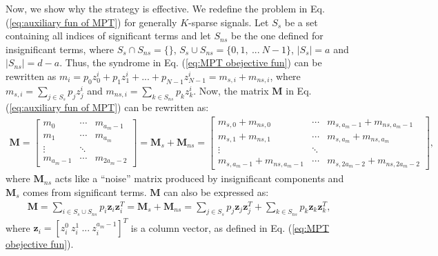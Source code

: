 \documentclass[journal,onecolumn,11pt]{IEEEtran}
\begin{document}
Now, we show why the strategy is effective.
We redefine the problem in Eq. (\ref{eq:auxiliary fun of MPT}) for generally $K$-sparse signals.
Let $S_{s}$ be a set containing all indices of significant terms and let $S_{ns}$ be the one defined for insignificant terms, where $S_{s} \cap S_{ns} = \{ \}$, $S_{s} \cup  S_{ns} = \{ 0,1, \ ... \ N -1 \}$, $|S_{s}| = a$ and $|S_{ns}| = d-a$.
Thus, the syndrome in Eq. (\ref{eq:MPT obejective fun}) can be rewritten as $ m_{i} = p_{0}z_{0}^{i}+p_{1}z_{1}^{i}+...+p_{N-1}z_{N-1}^{i} = m_{s,i}+m_{ns,i}$, where
$  m_{s,i} = \sum_{j \in S_{s} } p_{j}z_{j}^{i}$ and $ m_{ns,i} = \sum_{k \in S_{ns} } p_{k}z_{k}^{i}$.
Now, the matrix $\bm{M}$ in Eq. (\ref{eq:auxiliary fun of MPT}) can be rewritten as:
\small
\begin{equation}
\begin{aligned}
\bm{M}=
\begin{bmatrix}
       m_{0}  &  \cdots   &   m_{a_{m}-1}    \\
       m_{1}          & \cdots  &  m_{a_{m}} \\
        \vdots            & \ddots  &\\
       m_{a_{m}-1}            & \cdots   & m_{2a_{m}-2}
\end{bmatrix}=\bm{M}_{s}+\bm{M}_{ns}=
\begin{bmatrix}
       m_{s,0}+m_{ns,0}  &  \cdots   &   m_{s,a_{m}-1}+m_{ns,a_{m}-1}    \\
       m_{s,1}+m_{ns,1}          & \cdots  &  m_{s,a_{m}}+m_{ns,a_{m}} \\
        \vdots            & \ddots  &\\
       m_{s,a_{m}-1}+m_{ns,a_{m}-1}            & \cdots   & m_{s,2a_{m}-2}+m_{ns,2a_{m}-2}
\end{bmatrix},
\end{aligned}
\label{eq:formulation of M for general }
\end{equation}
\normalsize
where $\bm{M}_{ns}$ acts like a ``noise'' matrix produced by insignificant components and $\bm{M}_{s}$ comes from significant terms.
$\bm{M}$ can also be expressed as:
\small
\begin{equation}
\begin{aligned}
\bm{M}=\sum_{i \in S_{s}\cup S_{ns}}p_{i}\bm{z}_{i}\bm{z}_{i}^{T}= \bm{M}_{s}+\bm{M}_{ns}=\sum_{j \in S_s} p_{j}\bm{z}_{j}\bm{z}_{j}^{T}
+\sum_{k \in S_{ns}} p_{k}\bm{z}_{k}\bm{z}_{k}^{T},
\label{eq:formulation of another M for general}
\end{aligned}
\end{equation}
\normalsize
where $  \bm{z}_{i} = [ z_{i}^{0} \ z_{i}^{1} \ ... \ z_{i}^{a_{m}-1}   ]^{T}$  is a column vector, as defined in Eq. (\ref{eq:MPT obejective fun}).
\end{document}
